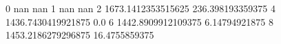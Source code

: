 0 nan nan
1 nan nan
2 1673.1412353515625 236.398193359375
4 1436.7430419921875 0.0
6 1442.8909912109375 6.14794921875
8 1453.2186279296875 16.4755859375
